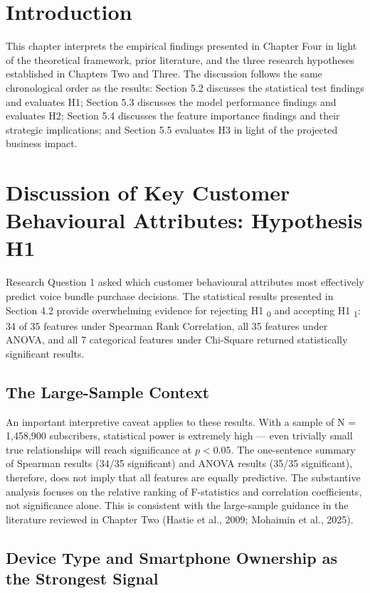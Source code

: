 
\section{Introduction}

This chapter interprets the empirical findings presented in Chapter Four in light of the theoretical framework, prior literature, and the three research hypotheses established in Chapters Two and Three. The discussion follows the same chronological order as the results: Section 5.2 discusses the statistical test findings and evaluates H1; Section 5.3 discusses the model performance findings and evaluates H2; Section 5.4 discusses the feature importance findings and their strategic implications; and Section 5.5 evaluates H3 in light of the projected business impact.


\section{Discussion of Key Customer Behavioural Attributes: Hypothesis H1}

Research Question 1 asked which customer behavioural attributes most effectively predict voice bundle purchase decisions. The statistical results presented in Section 4.2 provide overwhelming evidence for rejecting H1	\textsubscript{0} and accepting H1	\textsubscript{1}: 34 of 35 features under Spearman Rank Correlation, all 35 features under ANOVA, and all 7 categorical features under Chi-Square returned statistically significant results.


\subsection{The Large-Sample Context}

An important interpretive caveat applies to these results. With a sample of N = 1,458,900 subscribers, statistical power is extremely high --- even trivially small true relationships will reach significance at $p < 0.05$. The one-sentence summary of Spearman results (34/35 significant) and ANOVA results (35/35 significant), therefore, does not imply that all features are equally predictive. The substantive analysis focuses on the relative ranking of F-statistics and correlation coefficients, not significance alone. This is consistent with the large-sample guidance in the literature reviewed in Chapter Two (Hastie et al., 2009; Mohaimin et al., 2025).


\subsection{Device Type and Smartphone Ownership as the Strongest Signal}

